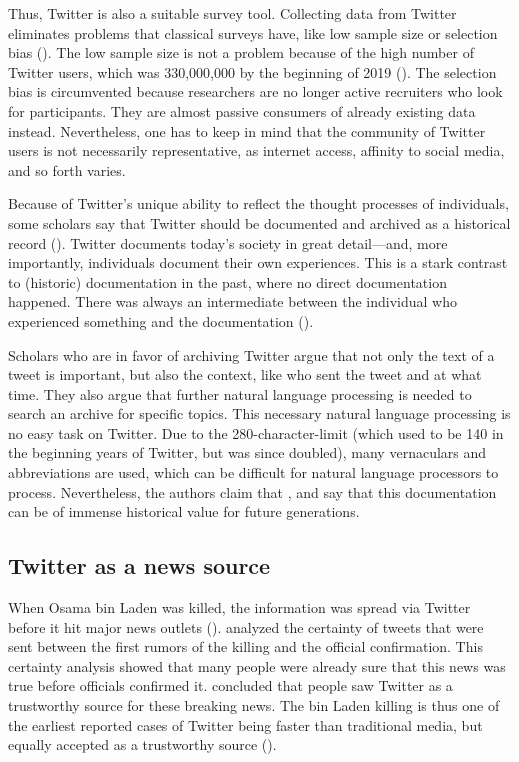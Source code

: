 Thus, Twitter is also a suitable survey tool. Collecting data from Twitter eliminates problems that classical surveys have, like low sample size or selection bias (\cite{takabeTwitterSurveyTool2016}). The low sample size is not a problem because of the high number of Twitter users, which was 330,000,000 by the beginning of 2019 (\cite{TwitterMonthlyActive}). The selection bias is circumvented because researchers are no longer active recruiters who look for participants. They are almost passive consumers of already existing data instead. Nevertheless, one has to keep in mind that the community of Twitter users is not necessarily representative, as internet access, affinity to social media, and so forth varies. %

Because of Twitter's unique ability to reflect the thought processes of individuals, some scholars say that Twitter should be documented and archived as a historical record (\cite{risse2014documenting}). Twitter documents today's society in great detail---and, more importantly, individuals document their own experiences. This is a stark contrast to (historic) documentation in the past, where no direct documentation happened. There was always an intermediate between the individual who experienced something and the documentation (\citeauthor{risse2014documenting}).

Scholars who are in favor of archiving Twitter argue that not only the text of a tweet is important, but also the context, like who sent the tweet and at what time. They also argue that further natural language processing is needed to search an archive for specific topics. This necessary natural language processing is no easy task on Twitter. Due to the 280-character-limit (which used to be 140 in the beginning years of Twitter, but was since doubled), many vernaculars and abbreviations are used, which can be difficult for natural language processors to process. Nevertheless, the authors claim that  \parencite[9]{risse2014documenting}, and say that this documentation can be of immense historical value for future generations.

\subsection{Twitter as a news source}  %
When Osama bin Laden was killed, the information was spread via Twitter before it hit major news outlets (\cite{hu2012breaking}). \citeauthor{hu2012breaking} analyzed the certainty of tweets that were sent between the first rumors of the killing and the official confirmation. This certainty analysis showed that many people were already sure that this news was true before officials confirmed it. \citeauthor{hu2012breaking} concluded that people saw Twitter as a trustworthy source for these breaking news. The bin Laden killing is thus one of the earliest reported cases of Twitter being faster than traditional media, but equally accepted as a trustworthy source (\cite[2751]{hu2012breaking}).

